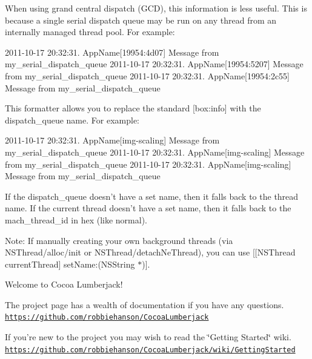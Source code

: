 When using grand central dispatch (G\-C\-D), this information is less useful. This is because a single serial dispatch queue may be run on any thread from an internally managed thread pool. For example\-:

2011-\/10-\/17 20\-:32\-:31. App\-Name\mbox{[}19954\-:4d07\mbox{]} Message from my\-\_\-serial\-\_\-dispatch\-\_\-queue 2011-\/10-\/17 20\-:32\-:31. App\-Name\mbox{[}19954\-:5207\mbox{]} Message from my\-\_\-serial\-\_\-dispatch\-\_\-queue 2011-\/10-\/17 20\-:32\-:31. App\-Name\mbox{[}19954\-:2c55\mbox{]} Message from my\-\_\-serial\-\_\-dispatch\-\_\-queue

This formatter allows you to replace the standard \mbox{[}box\-:info\mbox{]} with the dispatch\-\_\-queue name. For example\-:

2011-\/10-\/17 20\-:32\-:31. App\-Name\mbox{[}img-\/scaling\mbox{]} Message from my\-\_\-serial\-\_\-dispatch\-\_\-queue 2011-\/10-\/17 20\-:32\-:31. App\-Name\mbox{[}img-\/scaling\mbox{]} Message from my\-\_\-serial\-\_\-dispatch\-\_\-queue 2011-\/10-\/17 20\-:32\-:31. App\-Name\mbox{[}img-\/scaling\mbox{]} Message from my\-\_\-serial\-\_\-dispatch\-\_\-queue

If the dispatch\-\_\-queue doesn't have a set name, then it falls back to the thread name. If the current thread doesn't have a set name, then it falls back to the mach\-\_\-thread\-\_\-id in hex (like normal).

Note\-: If manually creating your own background threads (via N\-S\-Thread/alloc/init or N\-S\-Thread/detach\-Ne\-Thread), you can use \mbox{[}\mbox{[}N\-S\-Thread current\-Thread\mbox{]} set\-Name\-:(\-N\-S\-String $\ast$)\mbox{]}.

Welcome to Cocoa Lumberjack!

The project page has a wealth of documentation if you have any questions. \href{https://github.com/robbiehanson/CocoaLumberjack}{\tt https\-://github.\-com/robbiehanson/\-Cocoa\-Lumberjack}

If you're new to the project you may wish to read the \char`\"{}\-Getting Started\char`\"{} wiki. \href{https://github.com/robbiehanson/CocoaLumberjack/wiki/GettingStarted}{\tt https\-://github.\-com/robbiehanson/\-Cocoa\-Lumberjack/wiki/\-Getting\-Started} 

